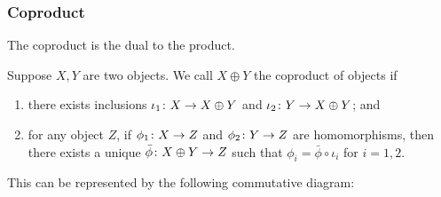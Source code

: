 \subsubsection*{Coproduct}

\begin{remark}
    The coproduct is the dual to the product.
\end{remark}

\begin{definition}
    Suppose \(X,Y\) are two objects.
    We call \(X \oplus Y\) the coproduct of objects if
    \begin{enumerate}[label={(\roman*)}, itemsep=0mm]
        \item there exists inclusions \(\iota_1\colon X\to X \oplus Y\)
            and \(\iota_2\colon Y\to X \oplus Y\); and
        \item for any object \(Z\),
            if \(\phi_1\colon X\to Z\) and \(\phi_2\colon Y\to Z\) are homomorphisms,
            then there exists a unique \(\bar{\phi}\colon X \oplus Y\to Z\)
            such that \(\phi_i = \bar{\phi}\circ\iota_i\) for \(i = 1,2\).
    \end{enumerate}

    This can be represented by the following commutative diagram:
    \begin{center}
    \end{center}
\end{definition}

